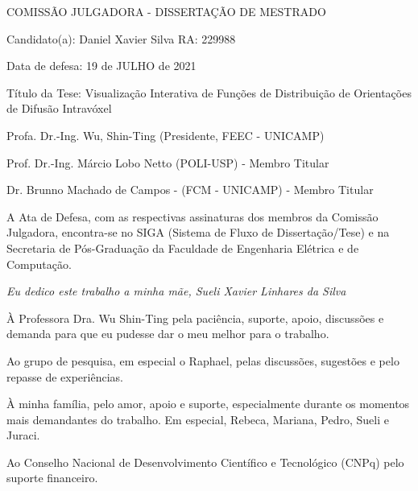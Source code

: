\documentclass[
    12pt,                %
    oneside,            %
    a4paper,            %
    english,            %
    french,                %
    spanish,            %
    brazil                %
    ]{abntex2}
\begin{document}
%
% 
%
\begin{folhadeaprovacao}

  \begin{center}
    COMISS\~{A}O JULGADORA - DISSERTAÇÃO DE MESTRADO
\end{center}
\noindent
\begin{minipage}{\textwidth}\SingleSpacing
Candidato(a): Daniel Xavier Silva     RA: 229988

Data de defesa: 19 de JULHO de 2021

T\'{i}tulo da Tese: Visualização Interativa de Funções de Distribuição de Orientações de Difusão Intravóxel
\vspace{2cm}

Profa. Dr.-Ing. Wu, Shin-Ting (Presidente, FEEC - UNICAMP)

Prof. Dr.-Ing. Márcio Lobo Netto (POLI-USP) - Membro Titular

Dr. Brunno Machado de Campos - (FCM - UNICAMP) - Membro Titular


\vspace{2cm}

A Ata de Defesa, com as respectivas assinaturas dos membros da Comissão Julgadora, encontra-se no SIGA (Sistema de Fluxo de Dissertação/Tese) e na Secretaria de Pós-Graduação da Faculdade de Engenharia Elétrica e de Computação.
\end{minipage}

\end{folhadeaprovacao}

\begin{dedicatoria}
   \vspace*{\fill}
   \centering
   \noindent
   \textit{Eu dedico este trabalho a minha mãe, Sueli Xavier Linhares da Silva} \vspace*{\fill}
\end{dedicatoria}

\begin{agradecimentos}
    À Professora Dra. Wu Shin-Ting pela paciência, suporte, apoio, discussões e demanda para que eu pudesse dar o meu melhor para o trabalho.
    
    Ao grupo de pesquisa, em especial o Raphael, pelas discussões, sugestões e pelo repasse de experiências.
    
    À minha família, pelo amor, apoio e suporte, especialmente durante os momentos mais demandantes do trabalho. Em especial, Rebeca, Mariana, Pedro, Sueli e Juraci.
    
    Ao Conselho Nacional de Desenvolvimento Científico  e Tecnológico (CNPq) pelo suporte financeiro.
\end{agradecimentos}
\end{document}
